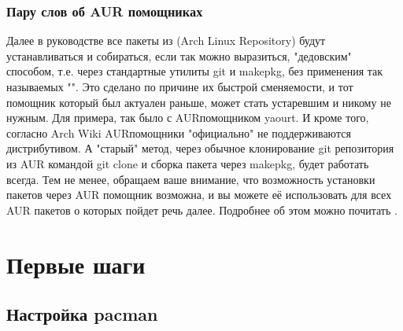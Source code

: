 \documentclass[letterpaper,10pt,russian,openany]{sphinxmanual}
\begin{document}
\ignorespaces 

\subsection{Пару слов об AUR помощниках}
\label{\detokenize{source/preface:aur}}\label{\detokenize{source/preface:aur-helpers}}\label{\detokenize{source/preface:index-1}}
\sphinxAtStartPar
Далее в руководстве все пакеты из 
(Arch Linux Repository) будут устанавливаться и собираться, если так можно выразиться, "дедовским" способом,
т.е. через стандартные утилиты git и makepkg, без применения так называемых "".
Это сделано по причине их быстрой сменяемости, и тот помощник который был актуален раньше, может стать устаревшим и никому не нужным.
Для примера, так было с AUR\sphinxhyphen{}помощником yaourt. И кроме того, согласно Arch Wiki AUR\sphinxhyphen{}помощники "официально" не поддерживаются дистрибутивом.
А "старый" метод, через обычное клонирование git репозитория из AUR командой git clone и сборка пакета через makepkg, будет работать всегда.
Тем не менее, обращаем ваше внимание, что возможность установки пакетов через AUR помощник возможна,
и вы можете её использовать для всех AUR пакетов о которых пойдет речь далее.
Подробнее об этом можно почитать .

\sphinxstepscope


\chapter{Первые шаги}
\label{\detokenize{source/first-steps:first-steps}}\label{\detokenize{source/first-steps:id1}}\label{\detokenize{source/first-steps::doc}}
\ignorespaces 

\section{Настройка pacman}
\label{\detokenize{source/first-steps:pacman}}\label{\detokenize{source/first-steps:pacman-settings}}\label{\detokenize{source/first-steps:index-0}}
\ignorespaces 
\end{document}
